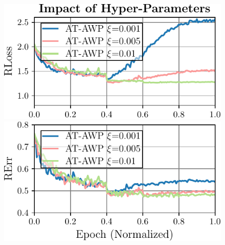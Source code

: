 \begin{figure}[t]
\begin{minipage}[t]{0.175\textwidth}
		\includegraphics[width=1.025\textwidth]{plots_main_understanding_ablation}
		\vspace*{-9px}
				
		\includegraphics[width=\textwidth]{plots_main_understanding_ablation_error}
	\end{minipage}
	\hspace*{1px}
	\begin{minipage}[t]{0.2\textwidth}
		\vspace*{0px}
	

\end{minipage}
\end{figure}
